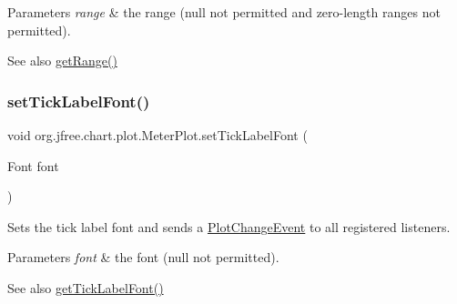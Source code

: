 \begin{DoxyParams}{Parameters}
{\em range} & the range ({\ttfamily null} not permitted and zero-\/length ranges not permitted).\\
\hline
\end{DoxyParams}
\begin{DoxySeeAlso}{See also}
\mbox{\hyperlink{classorg_1_1jfree_1_1chart_1_1plot_1_1_meter_plot_af69cddd1b820cce44f545b08b3a92af8}{get\+Range()}} 
\end{DoxySeeAlso}
\mbox{\label{classorg_1_1jfree_1_1chart_1_1plot_1_1_meter_plot_ad56c6b3df6614f5cada840323c89120b}} 
\subsubsection{\texorpdfstring{set\+Tick\+Label\+Font()}{setTickLabelFont()}}
{\footnotesize\ttfamily void org.\+jfree.\+chart.\+plot.\+Meter\+Plot.\+set\+Tick\+Label\+Font (\begin{DoxyParamCaption}\item[{Font}]{font }\end{DoxyParamCaption})}

Sets the tick label font and sends a \mbox{\hyperlink{}{Plot\+Change\+Event}} to all registered listeners.


\begin{DoxyParams}{Parameters}
{\em font} & the font ({\ttfamily null} not permitted).\\
\hline
\end{DoxyParams}
\begin{DoxySeeAlso}{See also}
\mbox{\hyperlink{classorg_1_1jfree_1_1chart_1_1plot_1_1_meter_plot_aec1151f0cb9d83a473e0b47cfebffeb4}{get\+Tick\+Label\+Font()}} 
\end{DoxySeeAlso}
\mbox{\label{classorg_1_1jfree_1_1chart_1_1plot_1_1_meter_plot_aafbb4bf29df5fb0818b1f8e4e4fc02e2}} 
